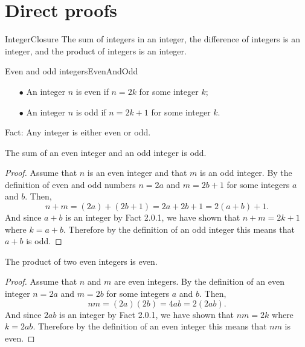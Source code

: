 \documentclass{report}
\begin{document}
\chapter{Direct proofs}

\begin{fact}{}{IntegerClosure}
  The sum of integers in an integer, the difference of integers is an integer, and the product of integers is an integer.
\end{fact}

\begin{definition}{Even and odd integers}{EvenAndOdd}
  \begin{itemize}
    \item[$\bullet$] An integer $n$ is even if $n = 2k$ for some integer $k$;
    \item[$\bullet$] An integer $n$ is odd if $n = 2k + 1$ for some integer $k$.
  \end{itemize}

  Fact: Any integer is either even or odd.

\end{definition}

\begin{proposition*}{}
  The sum of an even integer and an odd integer is odd.
\end{proposition*}

\begin{proof}
  Assume that $n$ is an even integer and that $m$ is an odd integer.
  By the definition of even and odd numbers $n = 2a$ and $m = 2b + 1$ for some integers $a$ and $b$.
  Then, $$n + m = (2a) + (2b + 1) = 2a + 2b + 1 = 2(a + b) + 1.$$
  And since $a + b$ is an integer by Fact 2.0.1, we have shown that $n + m = 2k + 1$ where $k = a + b$.
  Therefore by the definition of an odd integer this means that $a + b$ is odd.
\end{proof}

\begin{proposition*}{}
  The product of two even integers is even.
\end{proposition*}

\begin{proof}
  Assume that $n$ and $m$ are even integers.
  By the definition of an even integer $n = 2a$ and $m = 2b$ for some integers $a$ and $b$.
  Then, $$nm = (2a)(2b) = 4ab = 2(2ab).$$
  And since $2ab$ is an integer by Fact 2.0.1, we have shown that $nm = 2k$ where $k = 2ab$.
  Therefore by the definition of an even integer this means that $nm$ is even.
\end{proof}
\end{document}
